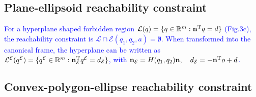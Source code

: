 \documentclass{article}
\newcommand{\new}[1]{\textcolor{blue}{#1}}
\begin{document}
\subsection{Plane-ellipsoid reachability constraint}\label{sec:ellipsoide-plane}
\new{For a hyperplane shaped forbidden region $\mathcal{L}(q) = \{q\in\mathbb{R}^m: \mathbf{n}^\mathrm{T} q = d\}$ (Fig.3c), the reachability constraint is $\mathcal{L} \cap \mathcal{E}(q_1,q_2,a) = \emptyset$. When transformed into the canonical frame, the hyperplane can be written as ${\mathcal{L}^{\mathcal{E}}}({q^{\mathcal{E}}}) = \{  {q^{\mathcal{E}}}\in\mathbb{R}^m:  \mathbf{n}_{\mathcal{E}}^\mathrm{T} {q^{\mathcal{E}}} = d_{\mathcal{E}}\}$, with $\mathbf{n}_{\mathcal{E}} = H(q_1,q_2)\mathbf{n}, \quad d_{\mathcal{E}} =-\mathbf{n}^\mathrm{T} o + d$.}
\renewcommand\thesubsection{G}
\def\sZ{\mathcal{Z}}
\subsection{Convex-polygon-ellipse reachability constraint}\label{sec:ellipse-region-constraint}
\end{document}

